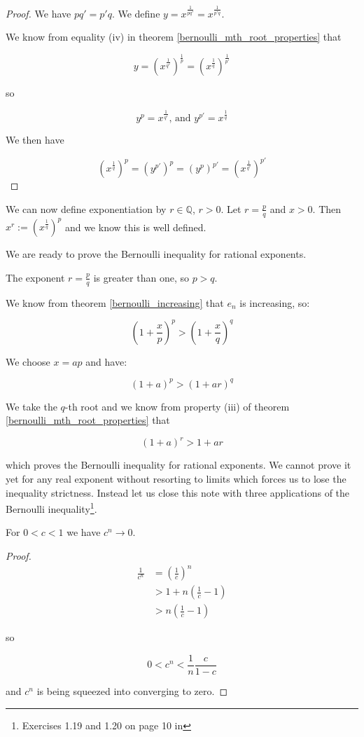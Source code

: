 \begin{proof}

We have $p q' = p' q$. We define $y = x^{\frac{1}{p q'}} = x^{\frac{1}{p' q}}$.

We know from equality (iv) in theorem \ref{bernoulli_mth_root_properties} that

$$
y = (x^{\frac{1}{q'}})^{\frac{1}{p}} = (x^{\frac{1}{q}})^{\frac{1}{p'}}
$$

so

$$
y^{p} = x^{\frac{1}{q'}} \text{, and } y^{p'} = x^{\frac{1}{q}}
$$

We then have

$$
(x^{\frac{1}{q}})^p = (y^{p'})^p = (y^{p})^{p'} = (x^{\frac{1}{q'}})^{p'}
$$

\end{proof}

We can now define exponentiation by $r \in \mathbb{Q}$, $r > 0$. Let $r = \frac{p}{q}$ and $x > 0$. Then $x^r := (x^{\frac{1}{q}})^p$ and we know this is well defined.

We are ready to prove the Bernoulli inequality for rational exponents.

The exponent $r = \frac{p}{q}$ is greater than one, so $p > q$.

We know from theorem \ref{bernoulli_increasing} that $e_n$ is increasing, so:

$$
(1 + \frac{x}{p})^{p} > (1 + \frac{x}{q})^{q}
$$

We choose $x = a p$ and have:

$$
(1 + a)^p > (1 + a r)^q
$$

We take the $q$-th root and we know from property (iii) of theorem \ref{bernoulli_mth_root_properties} that

$$
(1 + a)^r > 1 + a r
$$

which proves the Bernoulli inequality for rational exponents. We cannot prove it yet for any real exponent without resorting to limits which forces us to lose the inequality strictness. Instead let us close this note with three applications of the Bernoulli inequality\footnote{Exercises 1.19 and 1.20 on page 10 in }.

\begin{thm}
For $0 < c < 1$ we have $c^n \rightarrow 0$.
\end{thm}

\begin{proof}

\begin{align*}
\frac{1}{c^n} &= (\frac{1}{c})^n \\
              &> 1 + n (\frac{1}{c} - 1) \\
              &> n (\frac{1}{c} - 1)
\end{align*}

so 

$$
0 < c^n < \frac{1}{n} \frac{c}{1-c}
$$

and $c^n$ is being squeezed into converging to zero.
\end{proof}

